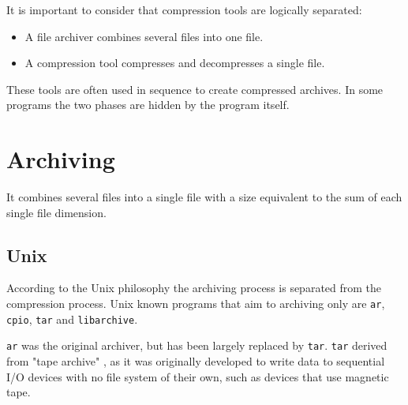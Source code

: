 \documentclass[12pt, a4paper]{report}
\begin{document}
It is important to consider that compression tools are logically separated:

\begin{itemize}
  \item A file archiver combines several files into one file.
  \item A compression tool compresses and decompresses a single file.
\end{itemize}

These tools are often used in sequence to create compressed archives.
In some programs the two phases are hidden by the program itself.

\section{Archiving}

It combines several files into a single file with a size equivalent to the sum of each single file dimension.



\subsection{Unix}

According to the Unix philosophy the archiving process is separated from the compression process.
Unix known programs that aim to archiving only are \texttt{ar}, \texttt{cpio}, \texttt{tar} and \texttt{libarchive}.

\texttt{ar} was the original archiver, but has been largely replaced by \texttt{tar}.
\texttt{tar} derived from "tape archive" , as it was originally developed to write data to sequential I/O devices with no file
system of their own, such as devices that use magnetic tape.
\end{document}

